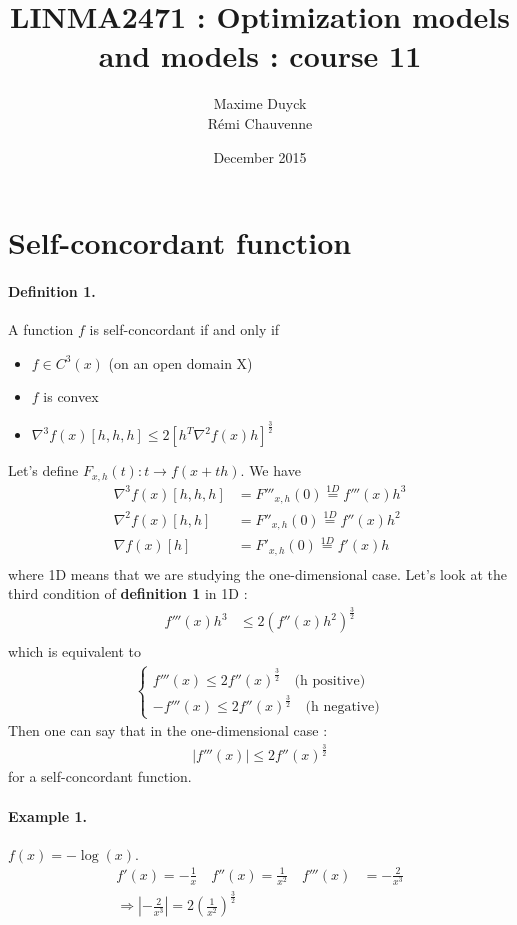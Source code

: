 \documentclass[a4paper,11pt]{article}
\title{LINMA2471 : Optimization models and models : course 11}
\author{Maxime Duyck \\ Rémi Chauvenne}
\date{December 2015}
\begin{document}
\maketitle

\section{Self-concordant function}

\paragraph{Definition 1.} A function $f$ is self-concordant if and only if
\begin{itemize}
\item $f \in C^3(x)$ (on an open domain X)
\item $f$ is convex
\item $\nabla^3 f(x)[h,h,h] \le 2[h^T \nabla^2 f(x) h]^\frac{3}{2}$
\end{itemize}
Let's define $F_{x,h}(t) : t \rightarrow f(x+th)$. We have
\begin{align*}
\nabla^3 f(x)[h,h,h] & = F'''_{x,h}(0) \stackrel{1D}{=} f'''(x)h^3 \\
\nabla^2 f(x)[h,h] & = F''_{x,h}(0) \stackrel{1D}{=} f''(x)h^2\\
\nabla f(x)[h] & = F'_{x,h}(0) \stackrel{1D}{=} f'(x)h\\
\end{align*}
where 1D means that we are studying the one-dimensional case. Let's look at the third condition of \textbf{definition 1} in 1D :
\begin{align*}
f'''(x)h^3 & \le 2 (f''(x)h^2)^\frac{3}{2} \\
\end{align*}
which is equivalent to
\begin{align*}
\left\{
\begin{aligned}
f'''(x) \le 2f''(x)^\frac{3}{2} \quad \text{(h positive)} \\
-f'''(x) \le 2f''(x)^\frac{3}{2} \quad \text{(h negative)}
\end{aligned}
\right.
\end{align*}
Then one can say that in the one-dimensional case :
\begin{align*}
|f'''(x)| \le 2f''(x)^\frac{3}{2}
\end{align*}
for a self-concordant function.
\paragraph{Example 1.} $f(x) = -\log{(x)}$. 
\begin{align*}
f'(x) = -\frac{1}{x} \quad f''(x) = \frac{1}{x^2} \quad f'''(x) & = -\frac{2}{x^3} \\
\Rightarrow \left|-\frac{2}{x^3}\right| = 2 \left(\frac{1}{x^2}\right)^\frac{3}{2}
\end{align*}
\end{document}
